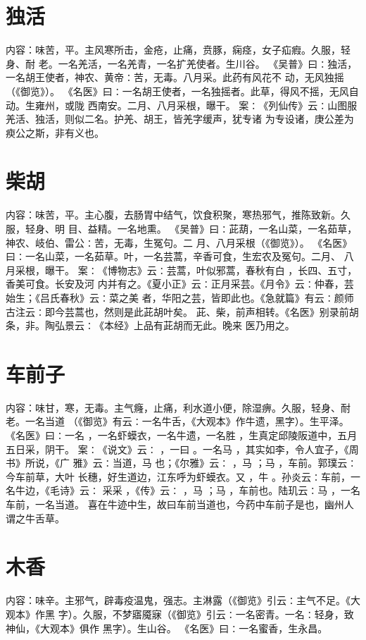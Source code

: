 \documentclass[12pt,UTF8]{ctexbook}
\begin{document}
\section{独活}
内容：味苦，平。主风寒所击，金疮，止痛，贲豚，痫痉，女子疝瘕。久服，轻身、耐 
老。一名羌活，一名羌青，一名扩羌使者。生川谷。 
《吴普》曰∶独活，一名胡王使者，神农、黄帝∶苦，无毒。八月采。此药有风花不 
动，无风独摇（《御览》）。 
《名医》曰∶一名胡王使者，一名独摇者。此草，得风不摇，无风自动。生雍州，或陇 
西南安。二月、八月采根，曝干。 
案∶《列仙传》云∶山图服羌活、独活，则似二名。护羌、胡王，皆羌字缓声，犹专诸 
为专设诸，庚公差为瘐公之斯，非有义也。 

\section{柴胡}
内容：味苦，平。主心腹，去肠胃中结气，饮食积聚，寒热邪气，推陈致新。久服，轻身、明 
目、益精。一名地熏。 
《吴普》曰∶茈葫，一名山菜，一名茹草，神农、岐伯、雷公∶苦，无毒，生冤句。二 
月、八月采根（《御览》）。 
《名医》曰∶一名山菜，一名茹草。叶，一名芸蒿，辛香可食，生宏农及冤句。二月、 
八月采根，曝干。 
案∶《博物志》云∶芸蒿，叶似邪蒿，春秋有白 ，长四、五寸，香美可食。长安及河 
内并有之。《夏小正》云∶正月采芸。《月令》云∶仲春，芸始生；《吕氏春秋》云∶菜之美 
者，华阳之芸，皆即此也。《急就篇》有云∶颜师古注云∶即今芸蒿也，然则是此茈胡叶矣。 
茈、柴，前声相转。《名医》别录前胡条，非。陶弘景云∶《本经》上品有茈胡而无此。晚来 
医乃用之。 

\section{车前子}
内容：味甘，寒，无毒。主气癃，止痛，利水道小便，除湿痹。久服，轻身、耐老。一名当道 
（《御览》有云∶一名牛舌，《大观本》作牛遗，黑字）。生平泽。 
《名医》曰∶一名 ，一名虾蟆衣，一名牛遗，一名胜 ，生真定邱陵阪道中，五月 
五日采，阴干。 
案∶《说文》云∶ ，一曰 。一名马 ，其实如李，令人宜子，《周书》所说，《广 
雅》云∶当道，马 也；《尔雅》云∶ ，马 ；马 ，车前。郭璞云∶今车前草，大叶 
长穗，好生道边，江东呼为虾蟆衣。又 ，牛 。孙炎云∶车前，一名牛边，《毛诗》云∶ 
采采 ，《传》云∶ ，马 ；马 ，车前也。陆玑云∶马 ，一名车前，一名当道。 
喜在牛迹中生，故曰车前当道也，今药中车前子是也，幽州人谓之牛舌草。 


\section{木香}
内容：味辛。主邪气，辟毒疫温鬼，强志。主淋露（《御览》引云∶主气不足。《大观本》作黑 
字）。久服，不梦寤魇寐（《御览》引云∶一名密青。一名∶轻身，致神仙，《大观本》俱作 
黑字）。生山谷。 
《名医》曰∶一名蜜香，生永昌。 
\end{document}
